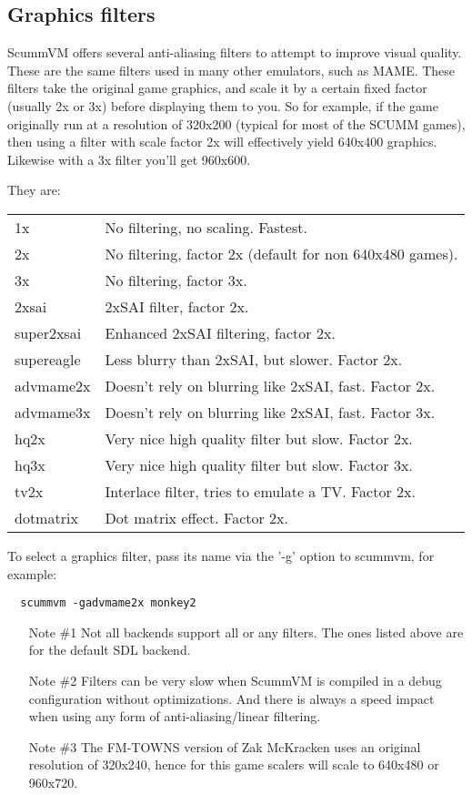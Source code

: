 \subsection{Graphics filters} \label{sect-gfx-filters}

ScummVM offers several anti-aliasing filters to attempt to improve visual
quality. These are the same filters used in many other emulators, such as
MAME. These filters take the original game graphics, and scale it by a
certain fixed factor (usually 2x or 3x) before displaying them to you.
So for example, if the game originally run at a resolution of 320x200
(typical for most of the SCUMM games), then using a filter with scale
factor 2x will effectively yield 640x400 graphics. Likewise with a
3x filter you'll get 960x600.

They are:\\
\begin{tabular}[h]{ll}
  1x         & No filtering, no scaling. Fastest.\\
  2x         & No filtering, factor 2x (default for non 640x480 games).\\
  3x         & No filtering, factor 3x.\\
  2xsai      & 2xSAI filter, factor 2x.\\
  super2xsai & Enhanced 2xSAI filtering, factor 2x.\\
  supereagle & Less blurry than 2xSAI, but slower. Factor 2x.\\
  advmame2x  & Doesn't rely on blurring like 2xSAI, fast. Factor 2x.\\
  advmame3x  & Doesn't rely on blurring like 2xSAI, fast. Factor 3x.\\
  hq2x       & Very nice high quality filter but slow. Factor 2x.\\
  hq3x       & Very nice high quality filter but slow. Factor 3x.\\
  tv2x       & Interlace filter, tries to emulate a TV. Factor 2x.\\
  dotmatrix  & Dot matrix effect. Factor 2x.\\
\end{tabular}

To select a graphics filter, pass its name via the '-g' option to scummvm,
for example:

\begin{verbatim}
  scummvm -gadvmame2x monkey2
\end{verbatim}
\begin{enumerate}
\item [Note \#1] Not all backends support all or any filters. The ones
  listed above are for the default SDL backend.
\item [Note \#2] Filters can be very slow when ScummVM is compiled in a
  debug configuration without optimizations. And there is always a
  speed impact when using any form of anti-aliasing/linear filtering.
\item [Note \#3] The FM-TOWNS version of Zak McKracken uses an
  original resolution of 320x240, hence for this game scalers will
  scale to 640x480 or 960x720.
\end{enumerate}


